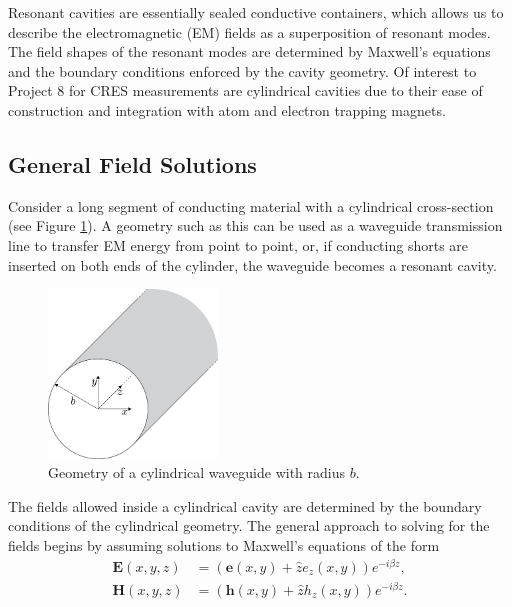 Resonant cavities are essentially sealed conductive containers, which allows us to describe the electromagnetic (EM) fields as a superposition of resonant modes. The field shapes of the resonant modes are determined by Maxwell's equations and the boundary conditions enforced by the cavity geometry. Of interest to Project 8 for CRES measurements are cylindrical cavities due to their ease of construction and integration with atom and electron trapping magnets. 

\subsection{General Field Solutions}

Consider a long segment of conducting material with a cylindrical cross-section (see Figure \ref{fig:chap6-circ-waveguide}). A geometry such as this can be used as a waveguide transmission line to transfer EM energy from point to point, or, if conducting shorts are inserted on both ends of the cylinder, the waveguide becomes a resonant cavity. 

\begin{figure}[htbp]
    \centering
    \includegraphics*[width=0.4\textwidth]{figs/Chapter-6/230606_circular_waveguide.png}
    \caption{\label{fig:chap6-circ-waveguide} Geometry of a cylindrical waveguide with radius $b$. }
\end{figure}

The fields allowed inside a cylindrical cavity are determined by the boundary conditions of the cylindrical geometry. The general approach to solving for the fields begins by assuming solutions to Maxwell's equations of the form
\begin{align}
    \label{eq:chap6-maxwell-eqn-solutions-E}\bm{E}(x,y,z)&=(\bm{e}(x,y)+\hat{z}e_z(x,y))e^{-i\beta z},\\
    \label{eq:chap6-maxwell-eqn-solutions-H}\bm{H}(x,y,z)&=(\bm{h}(x,y)+\hat{z}h_z(x,y))e^{-i\beta z}.
\end{align}

